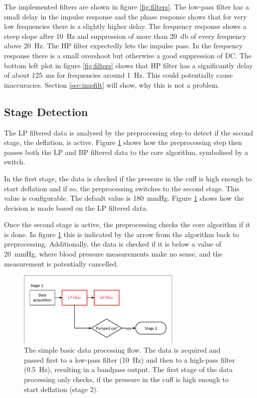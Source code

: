 The implemented filters are shown in figure \ref{fig:filters}. The low-pass filter has a small delay in the impulse response and the phase response shows that for very low frequencies there is a slightly higher delay. The frequency response shows a steep slope after \SI{10}{\Hz} and suppression of more than \SI{20}{\decibel} of every frequency above \SI{20}{\Hz}. The HP filter expectedly lets the impulse pass. In the frequency response there is a small overshoot but otherwise a good suppression of DC. The bottom left plot in figure \ref{fig:filters} shows that HP filter has a significantly delay of about \SI{125}{\milli\second} for frequencies around \SI{1}{\Hz}. This could potentially cause inaccuracies. Section \ref{sec:impfilt} will show, why this is not a problem.




\subsection{Stage Detection}
The LP filtered data is analysed by the preprocessing step to detect if the second stage, the deflation, is active. Figure \ref{fig:stage1} shows how the preprocessing step then passes both the LP and BP filtered data to the core algorithm, symbolised by a switch. 

In the first stage, the data is checked if the pressure in the cuff is high enough to start deflation and if so, the preprocessing switches to the second stage. This value is configurable. The default value is \SI{180}{\mmHg}. Figure \ref{fig:stage1} shows how the decision is made based on the LP filtered data.  

Once the second stage is active, the preprocessing checks the core algorithm if it is done. In figure \ref{fig:stage1} this is indicated by the arrow from the algorithm back to preprocessing. Additionally, the data is checked if it is below a value of \SI{20}{\mmHg}, where blood pressure measurements make no sense, and the measurement is  potentially cancelled.

\begin{figure}[ht]
\centering
\includegraphics[width=0.7\textwidth]{figures/stage1.pdf}
\caption{The simple basic data processing flow. The data is acquired and passed first to a low-pass filter (\SI{10}{\Hz}) and then to a high-pass filter (\SI{0.5}{\Hz}), resulting in a bandpass output. The first stage of the data processing only checks, if the pressure in the cuff is high enough to start deflation (stage 2).}
\label{fig:stage1}
\end{figure}

